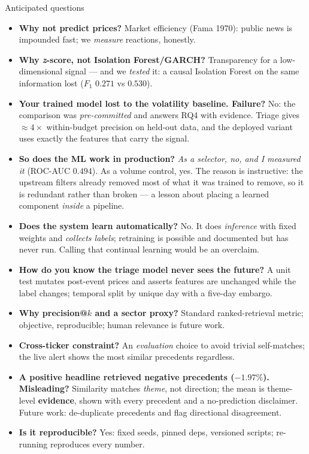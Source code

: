 \documentclass[aspectratio=169]{beamer}
\begin{document}
\begin{frame}{Anticipated questions}
\footnotesize
\begin{itemize}
  \item \textbf{Why not predict prices?} Market efficiency (Fama 1970): public news is impounded fast; we \emph{measure} reactions, honestly.
  \item \textbf{Why \emph{z}-score, not Isolation Forest/GARCH?} Transparency for a low-dimensional signal --- and we \emph{tested} it: a causal Isolation Forest on the same information lost ($F_1$ $0.271$ vs $0.530$).
  \item \textbf{Your trained model lost to the volatility baseline. Failure?} No: the comparison was \emph{pre-committed} and answers RQ4 with evidence. Triage gives $\approx 4\times$ within-budget precision on held-out data, and the deployed variant uses exactly the features that carry the signal.
  \item \textbf{So does the ML work in production?} \emph{As a selector, no, and I measured it} (ROC-AUC $0.494$). As a volume control, yes. The reason is instructive: the upstream filters already removed most of what it was trained to remove, so it is redundant rather than broken --- a lesson about placing a learned component \emph{inside} a pipeline.
  \item \textbf{Does the system learn automatically?} No. It does \emph{inference} with fixed weights and \emph{collects labels}; retraining is possible and documented but has never run. Calling that continual learning would be an overclaim.
  \item \textbf{How do you know the triage model never sees the future?} A unit test mutates post-event prices and asserts features are unchanged while the label changes; temporal split by unique day with a five-day embargo.
  \item \textbf{Why precision@$k$ and a sector proxy?} Standard ranked-retrieval metric; objective, reproducible; human relevance is future work.
  \item \textbf{Cross-ticker constraint?} An \emph{evaluation} choice to avoid trivial self-matches; the live alert shows the most similar precedents regardless.
  \item \textbf{A positive headline retrieved negative precedents ($-1.97\%$). Misleading?} Similarity matches \emph{theme}, not direction; the mean is theme-level \textbf{evidence}, shown with every precedent and a no-prediction disclaimer. Future work: de-duplicate precedents and flag directional disagreement.
  \item \textbf{Is it reproducible?} Yes: fixed seeds, pinned deps, versioned scripts; re-running reproduces every number.
\end{itemize}
\end{frame}
\end{document}
